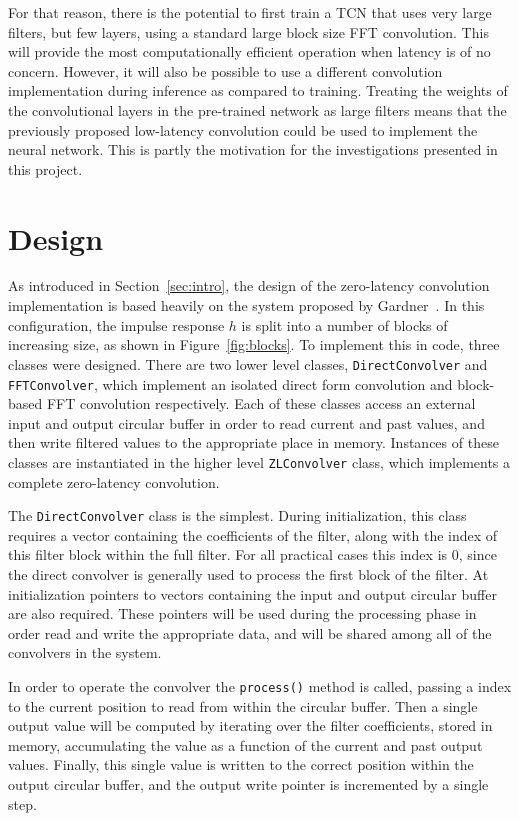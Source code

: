 \documentclass{article}
\begin{document}
For that reason, there is the potential to first train a TCN that uses very large filters, but few layers, 
using a standard large block size FFT convolution. 
This will provide the most computationally efficient operation when latency is of no concern. 
However, it will also be possible to use a different convolution implementation during inference as compared to training. 
Treating the weights of the convolutional layers in the pre-trained network as large filters means that the 
previously proposed low-latency convolution could be used to implement the neural network.
This is partly the motivation for the investigations presented in this project. 

\section{Design}

As introduced in Section~\ref{sec:intro}, the design of the zero-latency convolution implementation is based heavily on the system proposed by Gardner~\cite{gardner1994efficient}.
In this configuration, the impulse response $h$ is split into a number of blocks of increasing size, as shown in Figure~\ref{fig:blocks}. 
To implement this in code, three classes were designed. 
There are two lower level classes, \texttt{DirectConvolver} and \texttt{FFTConvolver}, 
which implement an isolated direct form convolution and block-based FFT convolution respectively. 
Each of these classes access an external input and output circular buffer in order to read current and past values, 
and then write filtered values to the appropriate place in memory. 
Instances of these classes are instantiated in the higher level \texttt{ZLConvolver} class, 
which implements a complete zero-latency convolution. 

The \texttt{DirectConvolver} class is the simplest. 
During initialization, this class requires a vector containing the coefficients of the filter, 
along with the index of this filter block within the full filter. 
For all practical cases this index is 0, since the direct convolver is generally used to process the first block of the filter. 
At initialization pointers to vectors containing the input and output circular buffer are also required. 
These pointers will be used during the processing phase in order read and write the appropriate data, 
and will be shared among all of the convolvers in the system.

In order to operate the convolver the \texttt{process()} method is called, 
passing a index to the current position to read from within the circular buffer.
Then a single output value will be computed by iterating over the filter coefficients, stored in memory, 
accumulating the value as a function of the current and past output values. 
Finally, this single value is written to the correct position within the output circular buffer, 
and the output write pointer is incremented by a single step. 
\end{document}
